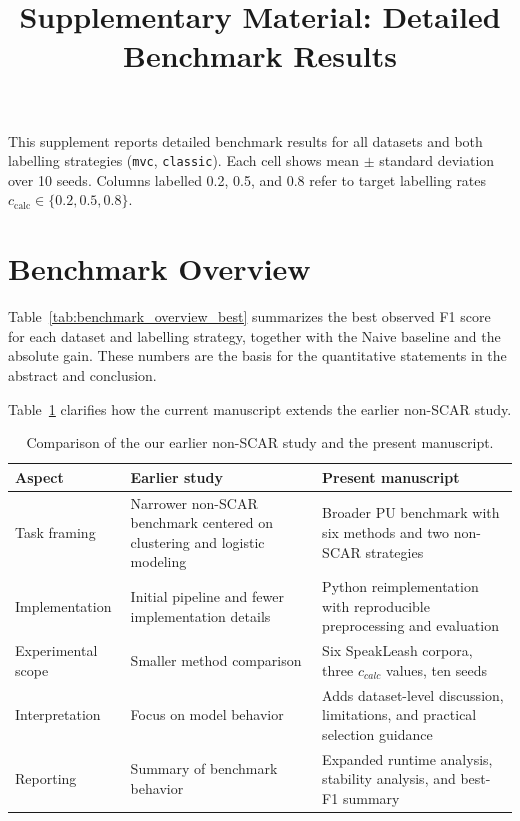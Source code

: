 \documentclass[11pt]{article}
\title{Supplementary Material: Detailed Benchmark Results}
\author{}
\date{}
\begin{document}
\renewcommand{\thetable}{S\arabic{table}}
\maketitle

This supplement reports detailed benchmark results for all datasets and both labelling strategies (\texttt{mvc}, \texttt{classic}). Each cell shows mean $\pm$ standard deviation over 10 seeds.
Columns labelled 0.2, 0.5, and 0.8 refer to target labelling rates $c_{\text{calc}} \in \{0.2, 0.5, 0.8\}$.

\section{Benchmark Overview}

Table~\ref{tab:benchmark_overview_best} summarizes the best observed F1 score for each dataset and labelling strategy, together with the Naive baseline and the absolute gain. These numbers are the basis for the quantitative statements in the abstract and conclusion.

Table~\ref{tab:prior_work_comparison} clarifies how the current manuscript extends the earlier non-SCAR study.

\begin{table}[H]
\caption{Comparison of the our  earlier non-SCAR study and the present manuscript.}
\label{tab:prior_work_comparison}
\centering
\small
\begin{tabularx}{\textwidth}{lXX}
\toprule
\textbf{Aspect} & \textbf{Earlier study} & \textbf{Present manuscript} \\
\midrule
Task framing & Narrower non-SCAR benchmark centered on clustering and logistic modeling & Broader PU benchmark with six methods and two non-SCAR strategies \\
Implementation & Initial pipeline and fewer implementation details & Python reimplementation with reproducible preprocessing and evaluation \\
Experimental scope & Smaller method comparison & Six SpeakLeash corpora, three $c_{calc}$ values, ten seeds \\
Interpretation & Focus on model behavior & Adds dataset-level discussion, limitations, and practical selection guidance \\
Reporting & Summary of benchmark behavior & Expanded runtime analysis, stability analysis, and best-F1 summary \\
\bottomrule
\end{tabularx}
\end{table}
\end{document}
